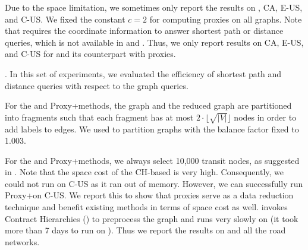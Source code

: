 Due to the space limitation, we sometimes only report the results on \dblpone, CA, E-US, and C-US.
We fixed the constant $c = 2$ for computing proxies on all graphs. Note that \ah requires the coordinate information to answer shortest path or distance queries, which is not available in \dblp and \dblpone. Thus, we only report results on CA, E-US, and C-US for \ah and its counterpart with proxies.




.
%
In this set of experiments, we evaluated the efficiency of shortest path and distance queries with respect to the graph queries.

For the \arcflag and Proxy+\arcflag methods, the graph and the reduced graph are partitioned into fragments such that each fragment has at most $2\cdot \lfloor\sqrt{|V|}\rfloor$ nodes in order to add labels to edges. We used \metis to partition graphs with the balance factor fixed to 1.003.

For the \tnr and Proxy+\tnr methods, we always select 10,000 transit nodes, as suggested in \cite{arz2013transit}. Note that the space cost of the CH-based \tnr is very high. Consequently, we could not run \tnr on C-US as it ran out of memory. However, we can successfully run Proxy+\tnr on C-US. We report this to show that proxies serve as a data reduction technique and benefit existing methods in terms of space cost as well. \tnr invokes Contract Hierarchies (\ch) \cite{GeisbergerSSD08} to preprocess the graph and \ch runs very slowly on \dblp (it took more than 7 days to run \ch on \dblp). Thus we report the results on \dblpone and all the road networks.

